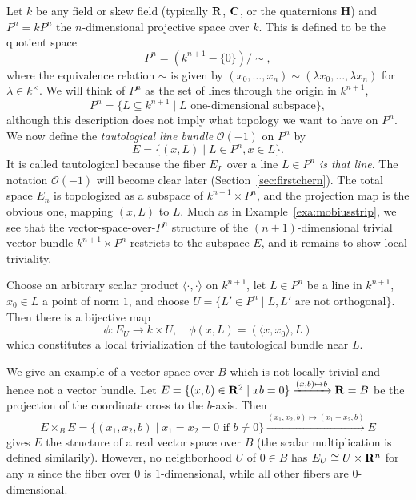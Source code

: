 \documentclass[a4paper,openany]{scrbook}
\begin{document}
\begin{example} \label{exa:tautological-bundles}
Let $k$ be any field or skew field (typically $\mathbf R$, $\mathbf C$, or the quaternions $\mathbf H$) and $P^n = kP^n$ the $n$-dimensional projective space over $k$. This is defined to be the quotient space
\[
P^n = \left(k^{n+1}-\{0\}\right)/\sim,
\]
where the equivalence relation $\sim$ is given by $(x_0,\dots,x_n) \sim (\lambda x_0,\dots,\lambda x_n)$ for $\lambda \in k^\times$. We will think of $P^n$ as the set of lines through the origin in $k^{n+1}$,
\[
P^n = \{ L \subseteq k^{n+1} \mid L \text{ one-dimensional subspace}\},
\]
although this description does not imply what topology we want to have on $P^n$.
We now define the \emph{tautological line bundle} $\mathcal O(-1)$ on $P^n$ by
\[
E = \{ (x,L) \mid L \in P^n, x \in L\}.
\]
It is called tautological because the fiber $E_L$ over a line $L \in P^n$ \emph{is that line}. The notation $\mathcal O(-1)$ will become clear later (Section~\ref{sec:firstchern}). The total space $E_n$ is topologized as a subspace of $k^{n+1} \times P^n$, and the projection map is the obvious one, mapping $(x,L)$ to $L$. Much as in Example~\ref{exa:mobiusstrip}, we see that the vector-space-over-$P^n$ structure of the $(n+1)$-dimensional trivial vector bundle $k^{n+1} \times P^n$ restricts to the subspace $E$, and it remains to show local triviality.

Choose an arbitrary scalar product $\langle \cdot,\cdot \rangle$ on $k^{n+1}$, let $L \in P^n$ be a line in $k^{n+1}$, $x_0 \in L$ a point of norm $1$, and choose $U = \{ L' \in P^n \mid L,L' \text{ are not orthogonal}\}$. Then there is a bijective map
\[
\phi\colon E_U \to k \times U, \quad \phi(x,L) = (\langle x,x_0\rangle,L)
\]
which constitutes a local trivialization of the tautological bundle near $L$.
\end{example}

\begin{example} \label{exa:coordinatecross}
We give an example of a vector space over $B$ which is not locally trivial and hence not a vector bundle. Let $E=\{(x,b) \in \mathbf R^2 \mid xb=0\} \xrightarrow{(x,b) \mapsto b} \mathbf R = B$ be the projection of the coordinate cross to the $b$-axis. Then
\[
E \times_B E = \{(x_1,x_2,b) \mid x_1=x_2=0 \text{ if } b\neq 0\} \xrightarrow{(x_1,x_2,b) \mapsto (x_1+x_2,b)} E
\]
gives $E$ the structure of a real vector space over $B$ (the scalar multiplication is defined similarily). However, no neighborhood $U$ of $0 \in B$ has $E_U \cong U \times \mathbf R^n$ for any $n$ since the fiber over $0$ is $1$-dimensional, while all other fibers are $0$-dimensional.
\end{example}
\end{document}
